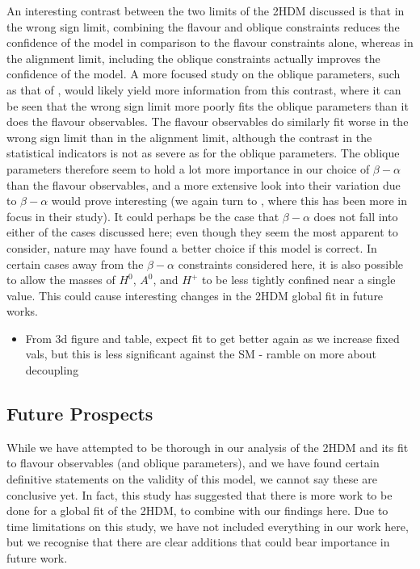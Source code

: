 \documentclass[a4paper,12pt]{article}
\begin{document}
An interesting contrast between the two limits of the 2HDM discussed is that in the wrong sign limit, combining the flavour and oblique constraints reduces the confidence of the model in comparison to the flavour constraints alone, whereas in the alignment limit, including the oblique constraints actually improves the confidence of the model. 
A more focused study on the oblique parameters, such as that of \cite{james}, would likely yield more information from this contrast, where it can be seen that the wrong sign limit more poorly fits the oblique parameters than it does the flavour observables. 
The flavour observables do similarly fit worse in the wrong sign limit than in the alignment limit, although the contrast in the statistical indicators is not as severe as for the oblique parameters.
The oblique parameters therefore seem to hold a lot more importance in our choice of $\beta-\alpha$ than the flavour observables, and a more extensive look into their variation due to $\beta-\alpha$ would prove interesting (we again turn to \cite{james}, where this has been more in focus in their study). 
It could perhaps be the case that $\beta-\alpha$ does not fall into either of the cases discussed here; even though they seem the most apparent to consider, nature may have found a better choice if this model is correct.
In certain cases away from the $\beta-\alpha$ constraints considered here, it is also possible to allow the masses of $H^0$, $A^0$, and $H^+$ to be less tightly confined near a single value. 
This could cause interesting changes in the 2HDM global fit in future works.
\begin{itemize}
    \item From 3d figure and table, expect fit to get better again as we increase fixed vals, but this is less significant against the SM - ramble on more about decoupling 
\end{itemize}

\subsection{Future Prospects}
While we have attempted to be thorough in our analysis of the 2HDM and its fit to flavour observables (and oblique parameters), and we have found certain definitive statements on the validity of this model, we cannot say these are conclusive yet. 
In fact, this study has suggested that there is more work to be done for a global fit of the 2HDM, to combine with our findings here.
Due to time limitations on this study, we have not included everything in our work here, but we recognise that there are clear additions that could bear importance in future work. 
\end{document}
